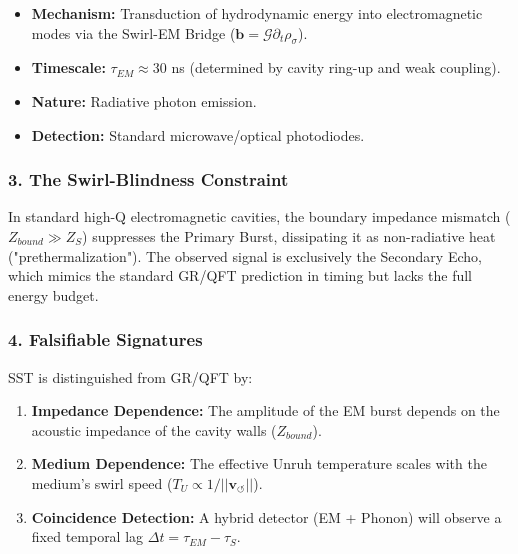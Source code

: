 \documentclass[10pt,reprint,aps,onecolumn,nofootinbib]{revtex4-2}
\begin{document}
            \begin{itemize}
                \item \textbf{Mechanism:} Transduction of hydrodynamic energy into electromagnetic modes via the Swirl-EM Bridge ($\mathbf{b} = \mathcal{G} \partial_t \rho_{\sigma}$).


                \item \textbf{Timescale:} $\tau_{EM} \approx 30$ ns (determined by cavity ring-up and weak coupling).


                \item \textbf{Nature:} Radiative photon emission.


                \item \textbf{Detection:} Standard microwave/optical photodiodes.


            \end{itemize}


        \subsubsection*{\textbf{3. The Swirl-Blindness Constraint}}


            In standard high-Q electromagnetic cavities, the boundary impedance mismatch ($Z_{bound} \gg Z_S$) suppresses the Primary Burst, dissipating it as non-radiative heat ("prethermalization"). The observed signal is exclusively the Secondary Echo, which mimics the standard GR/QFT prediction in timing but lacks the full energy budget.



        \subsubsection*{\textbf{4. Falsifiable Signatures}}


            SST is distinguished from GR/QFT by:

            \begin{enumerate}
                \item \textbf{Impedance Dependence:} The amplitude of the EM burst depends on the acoustic impedance of the cavity walls ($Z_{bound}$).


                \item \textbf{Medium Dependence:} The effective Unruh temperature scales with the medium's swirl speed ($T_U \propto 1/||\mathbf{v}_{\circlearrowleft}||$).


                \item \textbf{Coincidence Detection:} A hybrid detector (EM + Phonon) will observe a fixed temporal lag $\Delta t = \tau_{EM} - \tau_S$.


            \end{enumerate}
\end{document}
